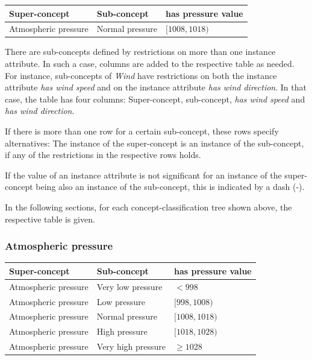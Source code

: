 \begin{longtable}{|p{}|p{}|p{}|}
  \hline
  \textbf{Super-concept} & \textbf{Sub-concept} & \textbf{has pressure value} \\
  \hline\hline
  Atmospheric pressure & Normal pressure & $[1008, 1018)$ \\
  \hline
\end{longtable}

There are sub-concepts defined by restrictions on more than one instance attribute. In such a case, columns are added to the respective table as needed. For instance, sub-concepts of \emph{Wind} have restrictions on both the instance attribute \emph{has wind speed} and on the instance attribute \emph{has wind direction}. In that case, the table has four columns: Super-concept, sub-concept, \emph{has wind speed} and \emph{has wind direction}.

If there is more than one row for a certain sub-concept, these rows specify alternatives: The instance of the super-concept is an instance of the sub-concept, if any of the restrictions in the respective rows holds.

If the value of an instance attribute is not significant for an instance of the super-concept being also an instance of the sub-concept, this is indicated by a dash (-).

In the following sections, for each concept-classification tree shown above, the respective table is given.

\subsubsection{Atmospheric pressure}

\begin{longtable}{|p{}|p{}|p{}|}
  \hline
  \textbf{Super-concept} & \textbf{Sub-concept} & \textbf{has pressure value} \\
  \hline\hline
  Atmospheric pressure & Very low pressure & $< 998$ \\
  \hline
  Atmospheric pressure & Low pressure & $[998, 1008)$ \\
  \hline
  Atmospheric pressure & Normal pressure & $[1008, 1018)$ \\
  \hline
  Atmospheric pressure & High pressure & $[1018, 1028)$ \\
  \hline
  Atmospheric pressure & Very high pressure & $\geq 1028$ \\
  \hline
\end{longtable}

